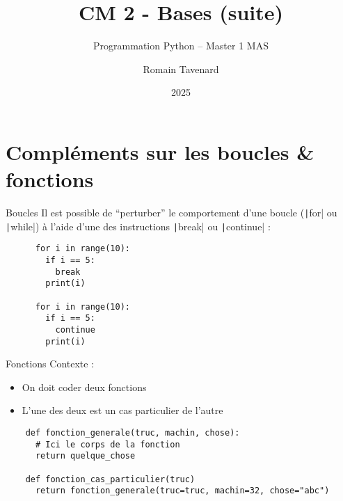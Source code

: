 \documentclass[10pt]{beamer}
\title[M1 MAS -- Python -- Bases (suite)]{CM 2 - Bases (suite)}
\subtitle{Programmation Python -- Master 1 MAS}
\author{Romain Tavenard}
\date{2025}
\institute{%
\hypersetup{urlcolor=.}
\makebox[2.2ex][c]{\faEnvelope}\enspace\href{mailto:romain.tavenard@univ-rennes2.fr}{\texttt{romain.tavenard@univ-rennes2.fr}}\\%
}
\begin{document}
\maketitle

\section{Compléments sur les boucles \& fonctions}

\begin{frame}[fragile]{Boucles}  
  Il est possible de ``perturber'' le comportement d'une boucle (\texttt|for| ou \texttt|while|) à l'aide d'une des instructions \texttt|break| ou \texttt|continue| :

  \begin{beamercodeblock}
    \begin{verbatim}
      for i in range(10):
        if i == 5:
          break
        print(i)
      
      for i in range(10):
        if i == 5:
          continue
        print(i)
    \end{verbatim}
  \end{beamercodeblock}
\end{frame}

\begin{frame}[fragile]{Fonctions}  
  Contexte :

  \begin{itemize}
    \item On doit coder deux fonctions
    \item L'une des deux est un cas particulier de l'autre
  \end{itemize}

  \begin{beamercodeblock}
    \begin{verbatim}
    def fonction_generale(truc, machin, chose):
      # Ici le corps de la fonction
      return quelque_chose
    
    def fonction_cas_particulier(truc)
      return fonction_generale(truc=truc, machin=32, chose="abc")
    \end{verbatim}
  \end{beamercodeblock}
\end{frame}
\end{document}
